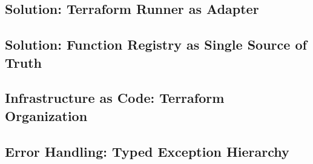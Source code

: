 \subsection{Solution: Terraform Runner as Adapter}
%
%
%

\subsection{Solution: Function Registry as Single Source of Truth}
%
%
%

\subsection{Infrastructure as Code: Terraform Organization}
%

\subsection{Error Handling: Typed Exception Hierarchy}
%
%
%
%

